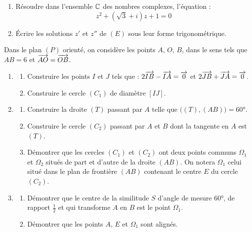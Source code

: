 \documentclass[11pt]{article}
\begin{document}
\begin{enumerate}
  \item Résoudre dans l'ensemble $\mathbb{C}$ des nombres complexes, l'équation :
  \[ z^2 + (\sqrt{3} + i)z + 1 = 0 \tag{E} \]
  \item Écrire les solutions $z'$ et $z''$ de $(E)$ sous leur forme trigonométrique.
\end{enumerate}


Dans le plan $(P)$ orienté, on considère les points $A$, $O$, $B$, dans le sens tels que $AB = 6$ et $\overrightarrow{AO} = \overrightarrow{OB}$.

\begin{enumerate}[label=\Roman*.]
  \item \begin{enumerate}
    \item Construire les points $I$ et $J$ tels que : $2\overrightarrow{IB} - \overrightarrow{IA} = \overrightarrow{0}$ et $2\overrightarrow{JB} + \overrightarrow{JA} = \overrightarrow{0}$.
    \item Construire le cercle $(C_1)$ de diamètre $[IJ]$.
  \end{enumerate}
  \item \begin{enumerate}
    \item Construire la droite $(T)$ passant par $A$ telle que $\big((T),(AB)\big) = 60°$.
    \item Construire le cercle $(C_2)$ passant par $A$ et $B$ dont la tangente en $A$ est $(T)$.
    \item Démontrer que les cercles $(C_1)$ et $(C_2)$ ont deux points communs $\Omega_1$ et $\Omega_2$ situés de part et d'autre de la droite $(AB)$. On notera $\Omega_1$ celui situé dans le plan de frontière $(AB)$ contenant le centre $E$ du cercle $(C_2)$.
  \end{enumerate}
  \item \begin{enumerate}
    \item Démontrer que le centre de la similitude $S$ d'angle de mesure $60°$, de rapport $\tfrac{1}{2}$ et qui transforme $A$ en $B$ est le point $\Omega_1$.
    \item Démontrer que les points $A$, $E$ et $\Omega_1$ sont alignés.
  \end{enumerate}
\end{enumerate}
\end{document}
